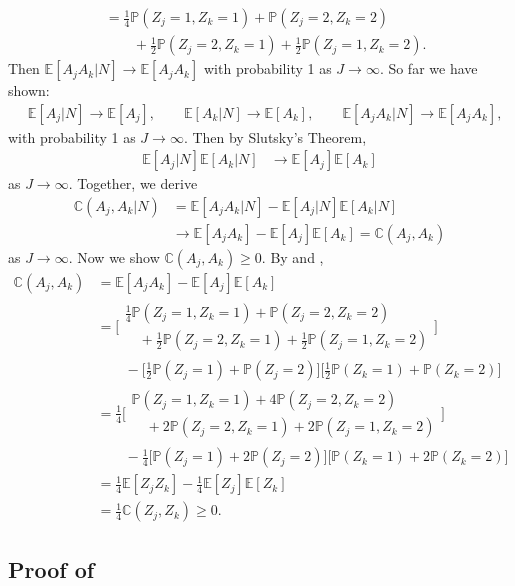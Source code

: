 \documentclass[12pt]{extarticle}
\newcommand{\pp}{\mathbb{P}}
\newcommand{\E}{\mathbb{E}}
\newcommand{\nind}{J}
\newcommand{\cV}{\mathbb{C}}
\begin{document}
{{\begin{align}
&= \frac{1}{4}\pp(Z_j=1,Z_k=1) + \pp(Z_j=2,Z_k=2) \nonumber \\
& \qquad + \frac{1}{2}\pp(Z_j=2,Z_k=1) + \frac{1}{2}\pp(Z_j=1,Z_k=2). \tag{A7.b} \label{eq:d2}
\end{align}}Then $\E[A_jA_k|N] \to \E[A_jA_k]$ with probability 1 as $\nind \to \infty$. So far we have shown: 
\begin{align*}& \E[A_j|N] \to \E[A_j], \qquad \E[A_k|N] \to \E[A_k], \qquad \E[A_jA_k|N] \to \E[A_jA_k],
\end{align*} with probability 1 as $\nind \to \infty$. Then by Slutsky's Theorem, 
\begin{align*}\E[A_j|N]\E[A_k|N] &\to \E[A_j]\E[A_k]
\end{align*} as $\nind \to \infty$. Together, we derive 
\begin{align*}\cV(A_j,A_k|N) &= \E[A_jA_k|N] - \E[A_j|N]\E[A_k|N] \nonumber \\
&\to \E[A_jA_k] - \E[A_j]\E[A_k] = \cV(A_j,A_k)
\end{align*} as $\nind \to \infty$. Now we show $\cV(A_j,A_k)\geq 0$. By  and , 
{\allowdisplaybreaks \begin{align*}
\cV(A_j,A_k) &= \E[A_jA_k]-\E[A_j]\E[A_k] \nonumber \\
&= \Big[\begin{array}{l}
   \frac{1}{4}\pp(Z_j=1,Z_k=1) + \pp(Z_j=2,Z_k=2) \\
   \quad + \frac{1}{2}\pp(Z_j=2,Z_k=1) + \frac{1}{2}\pp(Z_j=1,Z_k=2)
   \end{array}\Big] ~ \nonumber \\
& \qquad - \Big[\frac{1}{2}\pp(Z_j=1)+\pp(Z_j=2)\Big]\Big[\frac{1}{2}\pp(Z_k=1)+\pp(Z_k=2)\Big] \nonumber \\
&= \frac{1}{4}\Big[\begin{array}{l}
   \pp(Z_j=1,Z_k=1) + 4\pp(Z_j=2,Z_k=2) \\
   \quad + 2\pp(Z_j=2,Z_k=1) + 2\pp(Z_j=1,Z_k=2)
   \end{array}\Big] ~ \nonumber \\
& \qquad - \frac{1}{4}\Big[\pp(Z_j=1)+2\pp(Z_j=2)\Big]\Big[\pp(Z_k=1)+2\pp(Z_k=2)\Big] \nonumber \\
&= \frac{1}{4}\E[Z_jZ_k] - \frac{1}{4}\E[Z_j]\E[Z_k] \nonumber \\
&= \frac{1}{4}\cV(Z_j,Z_k) \geq 0.
\end{align*}}


\subsection{Proof of } \label{app:cov_between_family}

}
\end{document}
